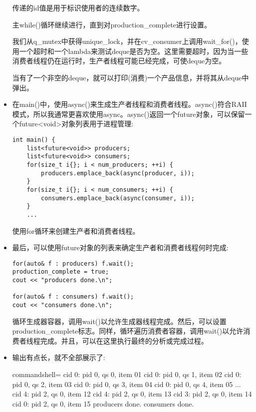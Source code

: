 \begin{itemize}
传递的id值是用于标识使用者的连续数字。

主while()循环继续进行，直到对production\_complete进行设置。

我们从q\_mutex中获得unique\_lock，并在cv\_consumer上调用wait\_for()，使用一个超时和一个lambda来测试deque是否为空。这里需要超时，因为当一些消费者线程仍在运行时，生产者线程可能已经完成，可使deque为空。

当有了一个非空的deque，就可以打印(消费)一个产品信息，并将其从deque中弹出。

\item 
在main()中，使用async()来生成生产者线程和消费者线程。async()符合RAII模式，所以我通常更喜欢使用async。async()返回一个future对象，可以保留一个future<void>对象列表用于进程管理:

\begin{lstlisting}[style=styleCXX]
int main() {
	list<future<void>> producers;
	list<future<void>> consumers;
	for(size_t i{}; i < num_producers; ++i) {
		producers.emplace_back(async(producer, i));
	}
	for(size_t i{}; i < num_consumers; ++i) {
		consumers.emplace_back(async(consumer, i));
	}
	...
\end{lstlisting}

使用for循环来创建生产者和消费者线程。

\item 
最后，可以使用future对象的列表来确定生产者和消费者线程何时完成:

\begin{lstlisting}[style=styleCXX]
for(auto& f : producers) f.wait();
production_complete = true;
cout << "producers done.\n";

for(auto& f : consumers) f.wait();
cout << "consumers done.\n";
\end{lstlisting}

循环生成器容器，调用wait()以允许生成器线程完成。然后，可以设置production\_complete标志。同样，循环遍历消费者容器，调用wait()以允许消费者线程完成。并且，可以在这里执行最终的分析或完成过程。

\item 
输出有点长，就不全部展示了:

\begin{tcblisting}{commandshell={}}
cid 0: pid 0, qs 0, item 01
cid 0: pid 0, qs 1, item 02
cid 0: pid 0, qs 2, item 03
cid 0: pid 0, qs 3, item 04
cid 0: pid 0, qs 4, item 05
...
cid 4: pid 2, qs 0, item 12
cid 4: pid 2, qs 0, item 13
cid 3: pid 2, qs 0, item 14
cid 0: pid 2, qs 0, item 15
producers done.
consumers done.
\end{tcblisting}

\end{itemize}


